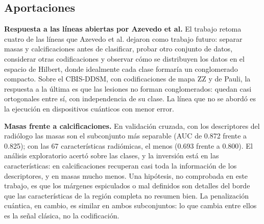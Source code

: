 
\subsection{Aportaciones}
\label{sec:aportaciones}

\textbf{Respuesta a las líneas abiertas por Azevedo et al.} El trabajo retoma cuatro de las líneas que
Azevedo et al. \cite{Azevedo2022QuantumTransfer} dejaron como trabajo futuro: separar masas y
calcificaciones antes de clasificar, probar otro conjunto de datos, considerar otras codificaciones y
observar cómo se distribuyen los datos en el espacio de Hilbert, donde idealmente cada clase formaría un
conglomerado compacto. Sobre el CBIS-DDSM, con codificaciones de mapa ZZ y de Pauli, la respuesta a la
última es que las lesiones no forman conglomerados: quedan casi ortogonales entre sí, con independencia
de su clase. La línea que no se abordó es la ejecución en dispositivos cuánticos con menor error.

\textbf{Masas frente a calcificaciones.} En validación cruzada, con los descriptores del radiólogo
las masas son el subconjunto más separable (AUC de 0.872 frente a 0.825); con las 67 características
radiómicas, el menos (0.693 frente a 0.800). El análisis exploratorio acertó sobre las clases, y la
inversión está en las características: en calcificaciones recuperan casi toda la información de los
descriptores, y en masas mucho menos. Una hipótesis, no comprobada en este trabajo, es que los márgenes
espiculados o mal definidos son detalles del borde que las características de la región completa no
resumen bien. La penalización cuántica, en cambio, es similar en ambos subconjuntos: lo que cambia entre
ellos es la señal clásica, no la codificación.

